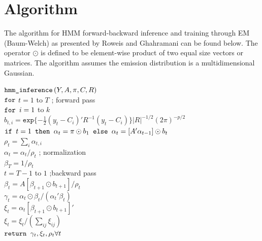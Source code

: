 \section{Algorithm}

The algorithm for HMM forward-backward inference and training through EM
(Baum-Welch) as presented by Roweis and Ghahramani \cite{ghahramani} can be
found below. The operator $\odot$ is defined to be element-wise product of two
equal size vectors or matrices. The algorithm assumes the emission distribution
is a multidimensional Gaussian.

\begin{algorithm}[h]
\begin{pseudocode}
\codename $\mbox{\texttt{hmm\_inference}}\left(Y,A,\pi,C,R\right)$\\
\codeline $\mbox{\texttt{for}} $ $t=1$ to  $T$  ; forward pass \\
\codeline \> $\mbox{\texttt{for }} i=1$ to $k$ \\
\codeline \> \> $b_{t,i}=\texttt{exp}\{-\frac{1}{2}(y_t - C_i)'R^{-1}(y_t - C_i)\}|R|^{-1/2}(2\pi)^{-p/2}$\\
\codeline \> $\mbox{\texttt{if }} t=1 \mbox{\texttt{ then }} \alpha_t = \pi \odot b_1\mbox{\texttt{ else }} \alpha_t = [A'\alpha_{t-1}]\odot b_t$ \\
\codeline \> $\rho_t = \sum_i \alpha_{t,i}$\\
\codeline \> $\alpha_t = \alpha_t / \rho_t$ ; normalization \\
\codeline  $\beta_T = 1/\rho_t$ \\
\codeline {} $t=T-1$ to $1$ ;backward pass\\
\codeline \> $\beta_t = A[\beta_{t+1} \odot b_{t+1}]/ \rho_t$\\
\codeline  $\gamma_t = \alpha_t \odot \beta_t / (\alpha_t'\beta_t)$\\
\codeline  $\xi_t = \alpha_t[\beta_{t+1} \odot b_{t+1}]'$\\
\codeline  $\xi_t = \xi_t / (\sum_{ij}\xi_{ij})$\\
\codeline  $\mbox{\texttt{return }} \gamma_t, \xi_t, \rho_t \forall t$
\end{pseudocode}
\end{algorithm}

